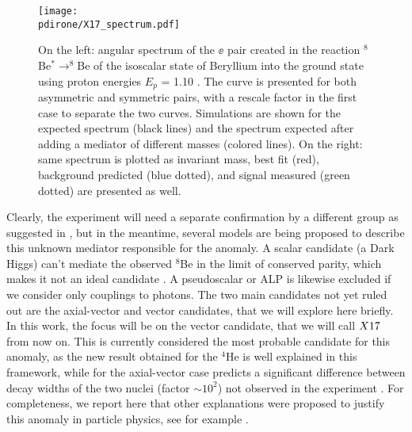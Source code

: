 \begin{figure}[htb!]
  \centering
  \texttt{[image: \\pdirone/X17\_spectrum.pdf]}
  \caption[$^8$Be anomaly]{On the left: angular spectrum of the $\ee$ pair created in the reaction $^8$Be$^* \to ^8$Be of the isoscalar state of Beryllium into the ground state using proton energies $E_p$ = 1.10 \mev. The curve is presented for both asymmetric and symmetric pairs, with a rescale factor in the first case to separate the two curves. Simulations are shown for the expected spectrum (black lines) and the spectrum expected after adding a mediator of different masses (colored lines). On the right: same spectrum is plotted as invariant mass, best fit (red), background predicted (blue dotted), and signal measured (green dotted) are presented as well. \cite{Krasznahorkay:2015iga}}
  \label{fig:be-anomaly}
\end{figure}

Clearly, the experiment will need a separate confirmation by a different group as suggested in \cite{Feng:2020mbt}, but in the meantime, several models are being proposed to describe this unknown mediator responsible for the anomaly. A scalar candidate (a Dark Higgs) can't mediate the observed $^8$Be in the limit of conserved parity, which makes it not an ideal candidate \cite{PhysRevD.95.035017}. A pseudoscalar or ALP is likewise excluded if we consider only couplings to photons. The two main candidates not yet ruled out are the axial-vector and vector candidates, that we will explore here briefly. In this work, the focus will be on the vector candidate, that we will call $X17$ from now on. This is currently considered the most probable candidate for this anomaly, as the new result obtained for the $^4$He is well explained in this framework, while for the axial-vector case predicts a significant difference between decay widths of the two nuclei (factor $\sim10^2$) not observed in the experiment \cite{Feng:2020mbt}. For completeness, we report here that other explanations were proposed to justify this anomaly in particle physics, see for example \cite{Nam:2019osu, Seto:2016pks}.

